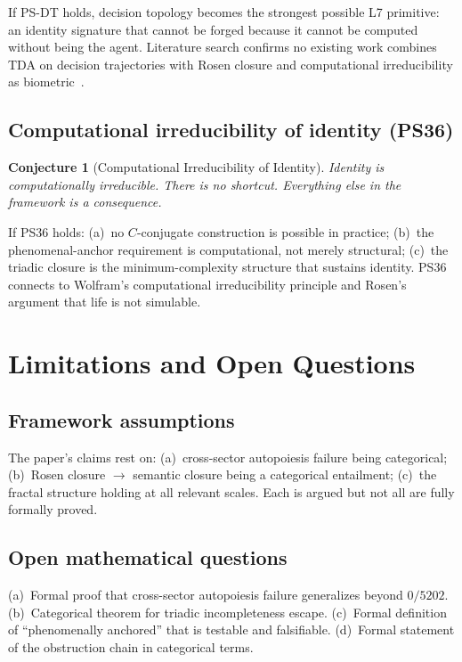 \documentclass[11pt,a4paper]{article}
\newtheorem{conjecture}{Conjecture}
\theoremstyle{definition}
\theoremstyle{remark}
\begin{document}
If PS-DT holds, decision topology becomes the strongest possible L7 primitive: an identity signature that cannot be forged because it cannot be computed without being the agent. Literature search confirms no existing work combines TDA on decision trajectories with Rosen closure and computational irreducibility as biometric~\cite{wolfram2002}.

\subsection{Computational irreducibility of identity (PS36)}

\begin{conjecture}[Computational Irreducibility of Identity]
Identity is computationally irreducible. There is no shortcut. Everything else in the framework is a consequence.
\end{conjecture}

If PS36 holds: (a)~no $C$-conjugate construction is possible in practice; (b)~the phenomenal-anchor requirement is computational, not merely structural; (c)~the triadic closure is the minimum-complexity structure that sustains identity. PS36 connects to Wolfram's computational irreducibility principle and Rosen's argument that life is not simulable.

\section{Limitations and Open Questions}
\label{sec:limits}

\subsection{Framework assumptions}

The paper's claims rest on: (a)~cross-sector autopoiesis failure being categorical; (b)~Rosen closure $\to$ semantic closure being a categorical entailment; (c)~the fractal structure holding at all relevant scales. Each is argued but not all are fully formally proved.

\subsection{Open mathematical questions}

(a)~Formal proof that cross-sector autopoiesis failure generalizes beyond $0/5202$. (b)~Categorical theorem for triadic incompleteness escape. (c)~Formal definition of ``phenomenally anchored'' that is testable and falsifiable. (d)~Formal statement of the obstruction chain in categorical terms.
\end{document}
